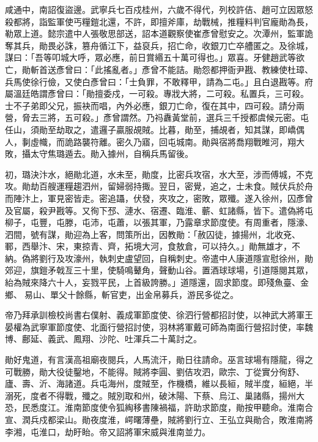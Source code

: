 \begin{pinyinscope}
 咸通中，南詔復盜邊。武寧兵七百戍桂州，六歲不得代，列校許佶、趙可立因眾怒殺都將，詣監軍使丐糧鎧北還，不許，即擅斧庫，劫戰械，推糧料判官龐勛為長，勒眾上道。懿宗遣中人張敬思部送，詔本道觀察使崔彥曾慰安之。次潭州，監軍詭奪其兵，勛畏必誅，篡舟循江下，益裒兵，招亡命，收銀刀亡卒艚匿之。及徐城，謀曰：「吾等叩城大呼，眾必應，前日賞緡五十萬可得也。」眾喜。牙健趙武等欲亡，勛斬首送彥曾曰：「此搖亂者。」彥曾不能詰。勛怨都押衙尹戡、教練使杜璋、兵馬使徐行儉，又使白彥曾曰：「士負罪，不敢釋甲，請為二屯。」且白退戡等。府屬溫廷皓謂彥曾曰：「勛擅委戍，一可殺。專戕大將，二可殺。私置兵，三可殺。士不子弟即父兄，振袂而唱，內外必應，銀刀亡命，復在其中，四可殺。請分兩營，脅去三將，五可殺。」彥曾謂然。乃祃纛黃堂前，選兵三千授都虞候元密。屯任山，須勛至劫取之，遣邏子贏服覘賊。比暮，勛至，捕覘者，知其謀，即嶠偶人，剚虛幟，而詭路襲符離。密久乃寤，回屯城南。勛與宿將喬翔戰睢河，翔大敗，攝太守焦璐遁去。勛入據州，自稱兵馬留後。



 初，璐決汴水，絕勛北道，水未至，勛度，比密兵攻宿，水大至，涉而傅城，不克攻。勛劫百艘運糧趨泗州，留婦弱持掫。翌日，密覺，追之，士未食。賊伏兵於舟而陣汴上，軍見密皆走。密追躡，伏發，夾攻之，密敗，眾殲。遂入徐州，囚彥曾及官屬，殺尹戡等。又徇下邳、漣水、宿遷、臨淮、蘄、虹諸縣，皆下。遣偽將屯柳子，屯豐，屯滕，屯沛，屯蕭，以張其軍，乃露章求節度使。有周重者，隱濠、泗間，號有謀，勛迎為上客，問策所出，因教勛：「赦囚徒，據揚州，北收兗、鄆，西舉汴、宋，東掠青、齊，拓境大河，食敖倉，可以持久。」勛無雄才，不納。偽將劉行及攻濠州，執刺史盧望回，自稱刺史。帝遣中人康道隱宣慰徐州，勛郊迎，旗鎧矛戟亙三十里，使騎鳴鼙角，聲動山谷。置酒球球場，引道隱閱其眾，紿為賊來降六十人，妄戮平民，上首級誇勝。」道隱還，固求節度。即殘魚臺、金鄉、易山、單父十餘縣，斬官吏，出金帛募兵，游民多從之。



 帝乃拜承訓檢校尚書右僕射、義成軍節度使、徐泗行營都招討使，以神武大將軍王晏權為武寧軍節度使、北面行營招討使，羽林將軍戴可師為南面行營招討使，率魏博、鄜延、義武、鳳翔、沙陀、吐渾兵二十萬討之。



 勛好鬼道，有言漢高祖廟夜閱兵，人馬流汗，勛日往請命。巫言球場有隱龍，得之可戰勝，勛大役徒鑿地，不能得。賊將李圓、劉佶攻泗，歐宗、丁從實分徇舒、廬、壽、沂、海諸道。兵屯海州，度賊至，作機橋，維以長絙，賊半度，絙絕，半溺死，度者不得戰，殲之。賊別取和州，破沐陽、下蔡、烏江、巢諸縣，揚州大恐，民悉度江。淮南節度使令狐綯移書陳禍福，許助求節度，勛按甲聽命。淮南合宣、潤兵戍都梁山。勛夜度淮，崿曙薄壘，賊將劉行立、王弘立與勛合，敗淮南將李湘，屯淮口，劫盱眙。帝又詔將軍宋威與淮南並力。




\end{pinyinscope}
